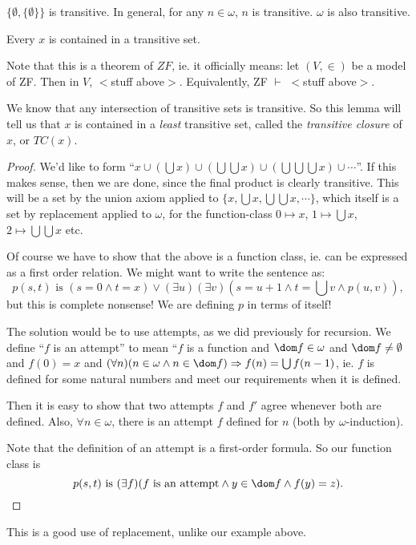 \documentclass[a4paper]{article}
\begin{document}
\begin{eg}
  $\{\emptyset, \{\emptyset\}\}$ is transitive. In general, for any $n\in \omega$, $n$ is transitive. $\omega$ is also transitive.
\end{eg}

\begin{lemma}
  Every $x$ is contained in a transitive set.
\end{lemma}
Note that this is a theorem of $ZF$, ie. it officially means: let $(V, \in)$ be a model of ZF. Then in $V$, $<$stuff above$>$. Equivalently, ZF $\vdash$ $<$stuff above$>$.

We know that any intersection of transitive sets is transitive. So this lemma will tell us that $x$ is contained in a \emph{least} transitive set, called the \emph{transitive closure} of $x$, or $TC(x)$.

\begin{proof}
  We'd like to form ``$x\cup (\bigcup x)\cup (\bigcup\bigcup x)\cup (\bigcup\bigcup\bigcup x)\cup \cdots$''. If this makes sense, then we are done, since the final product is clearly transitive. This will be a set by the union axiom applied to $\{x, \bigcup x, \bigcup\bigcup x, \cdots\}$, which itself is a set by replacement applied to $\omega$, for the function-class $0\mapsto x$, $1\mapsto \bigcup x$, $2\mapsto \bigcup\bigcup x$ etc.

  Of course we have to show that the above is a function class, ie. can be expressed as a first order relation. We might want to write the sentence as:
  \[
    p(s, t)\text{ is }(s = 0\wedge t = x)\vee (\exists u)(\exists v)(s = u + 1\wedge t = \textstyle{\bigcup} v \wedge p(u, v)),
  \]
  but this is complete nonsense! We are defining $p$ in terms of itself!

  The solution would be to use attempts, as we did previously for recursion. We define ``$f$ is an attempt'' to mean ``$f$ is a function and $\dom f\in \omega$ and $\dom f\not=\emptyset$ and $f(0) = x$ and $(\forall n)(n\in \omega \wedge n\in \dom f)\Rightarrow f(n) = \bigcup f(n - 1)$, ie. $f$ is defined for some natural numbers and meet our requirements when it is defined.

  Then it is easy to show that two attempts $f$ and $f'$ agree whenever both are defined. Also, $\forall n\in \omega$, there is an attempt $f$ defined for $n$ (both by $\omega$-induction).

  Note that the definition of an attempt is a first-order formula. So our function class is
  \[
    p(s, t)\text{ is } (\exists f)(f\text{ is an attempt}\wedge y\in \dom f \wedge f(y) = z).
  \]
\end{proof}
This is a good use of replacement, unlike our example above.
\end{document}
